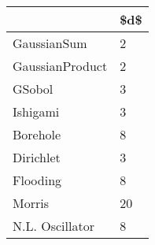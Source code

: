 \begin{tabular}{ll}
\toprule
{} & \$d\$ \\
\midrule
GaussianSum     &   2 \\
GaussianProduct &   2 \\
GSobol          &   3 \\
Ishigami        &   3 \\
Borehole        &   8 \\
Dirichlet       &   3 \\
Flooding        &   8 \\
Morris          &  20 \\
N.L. Oscillator &   8 \\
\bottomrule
\end{tabular}

